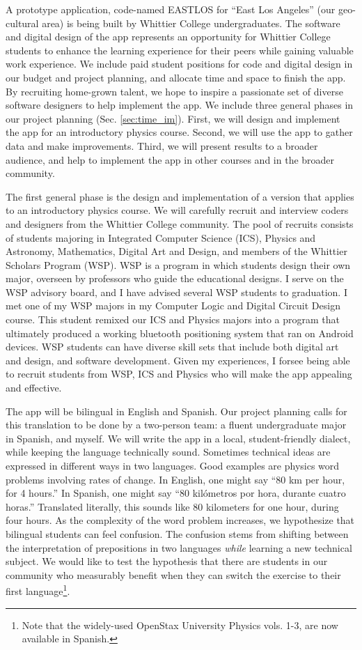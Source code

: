 \documentclass[10pt]{amsart}
\theoremstyle{definition}
\numberwithin{equation}{section}
\begin{document}
A prototype application, code-named EASTLOS for ``East Los Angeles'' (our geo-cultural area) is being built by Whittier College undergraduates.  The software and digital design of the app represents an opportunity for Whittier College students to enhance the learning experience for their peers while gaining valuable work experience.  We include paid student positions for code and digital design in our budget and project planning, and allocate time and space to finish the app.  By recruiting home-grown talent, we hope to inspire a passionate set of diverse software designers to help implement the app.  We include three general phases in our project planning (Sec. \ref{sec:time_im}).  First, we will design and implement the app for an introductory physics course.  Second, we will use the app to gather data and make improvements.  Third, we will present results to a broader audience, and help to implement the app in other courses and in the broader community. 

The first general phase is the design and implementation of a version that applies to an introductory physics course.  We will carefully recruit and interview coders and designers from the Whittier College community.  The pool of recruits consists of students majoring in Integrated Computer Science (ICS), Physics and Astronomy, Mathematics, Digital Art and Design, and members of the Whittier Scholars Program (WSP).  WSP is a program in which students design their own major, overseen by professors who guide the educational designs.  I serve on the WSP advisory board, and I have advised several WSP students to graduation.  I met one of my WSP majors in my Computer Logic and Digital Circuit Design course.  This student remixed our ICS and Physics majors into a program that ultimately produced a working bluetooth positioning system that ran on Android devices.  WSP students can have diverse skill sets that include both digital art and design, and software development.  Given my experiences, I forsee being able to recruit students from WSP, ICS and Physics who will make the app appealing and effective. 

The app will be bilingual in English and Spanish.  Our project planning calls for this translation to be done by a two-person team: a fluent undergraduate major in Spanish, and myself.  We will write the app in a local, student-friendly dialect, while keeping the language technically sound.  Sometimes technical ideas are expressed in different ways in two languages.  Good examples are physics word problems involving rates of change.  In English, one might say ``80 km per hour, for 4 hours.''  In Spanish, one might say ``80 kil\'{o}metros por hora, durante cuatro horas.''  Translated literally, this sounds like 80 kilometers for one hour, during four hours.  As the complexity of the word problem increases, we hypothesize that bilingual students can feel confusion.  The confusion stems from shifting between the interpretation of prepositions in two languages \textit{while} learning a new technical subject.  We would like to test the hypothesis that there are students in our community who measurably benefit when they can switch the exercise to their first language\footnote{Note that the widely-used OpenStax University Physics vols. 1-3, are now available in Spanish.}.
\end{document}
